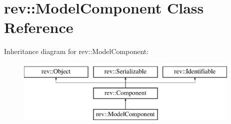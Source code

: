 \hypertarget{classrev_1_1_model_component}{}\section{rev\+::Model\+Component Class Reference}
\label{classrev_1_1_model_component}
Inheritance diagram for rev\+::Model\+Component\+:\begin{figure}[H]
\begin{center}
\leavevmode
\includegraphics[height=3.000000cm]{classrev_1_1_model_component}
\end{center}
\end{figure}
